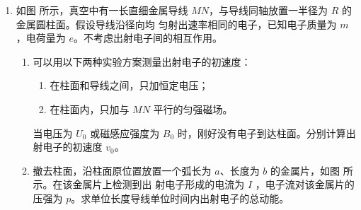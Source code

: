 \begin{enumerate}




\newpage
\item 
如图  所示，真空中有一长直细金属导线 $ MN $，与导线同轴放置一半径为 $ R $ 的金属圆柱面。假设导线沿径向均
匀射出速率相同的电子，已知电子质量为 $ m $，电荷量为 $ e $。不考虑出射电子间的相互作用。
\begin{enumerate}
\item
可以用以下两种实验方案测量出射电子的初速度：
\begin{enumerate}
	\item
在柱面和导线之间，只加恒定电压；

\item 
在柱面内，只加与 $ MN $ 平行的匀强磁场。
\end{enumerate}


当电压为 $ U_{0} $ 或磁感应强度为 $ B_{0} $ 时，刚好没有电子到达柱面。分别计算出射电子的初速度 $ v_{0} $。

\item 
撤去柱面，沿柱面原位置放置一个弧长为 $ a $、长度为 $ b $ 的金属片，如图  所示。在该金属片上检测到出
射电子形成的电流为 $ I $ ，电子流对该金属片的压强为 $ p $。求单位长度导线单位时间内出射电子的总动能。

\end{enumerate}
\begin{figure}[h!]
\flushright
\begin{subfigure}{0.3\linewidth}
\centering
 
\caption{}\label{2020:北京19:a}
\end{subfigure}
\begin{subfigure}{0.3\linewidth}
\centering
 
\caption{}\label{2020:北京19:b}
\end{subfigure}
\end{figure}



\end{enumerate}
